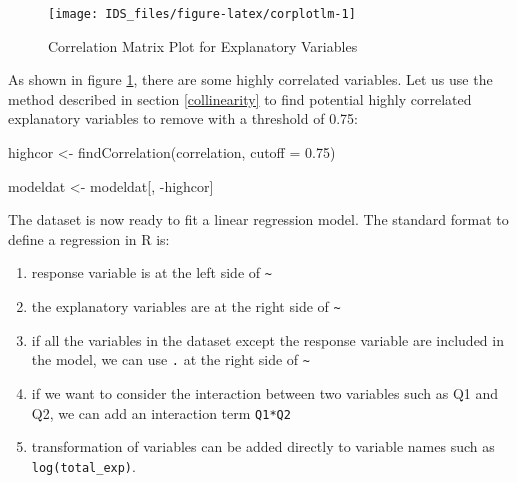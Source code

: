 \documentclass[
  12pt,
]{krantz}
\makeatletter
\newenvironment{Shaded}{\begin{snugshade}}{\end{snugshade}}
\newcommand{\AttributeTok}[1]{\textcolor[rgb]{0.61,0.61,0.61}{#1}}
\newcommand{\FloatTok}[1]{\textcolor[rgb]{0.06,0.06,0.06}{#1}}
\newcommand{\FunctionTok}[1]{\textcolor[rgb]{0,0,0}{#1}}
\newcommand{\NormalTok}[1]{#1}
\newcommand{\OtherTok}[1]{\textcolor[rgb]{0.37,0.37,0.37}{#1}}
\newcommand{\SpecialCharTok}[1]{\textcolor[rgb]{0,0,0}{#1}}
\newenvironment{kframe}{%
\medskip{}
\setlength{\fboxsep}{.8em}
 \def\at@end@of@kframe{}%
 \ifinner\ifhmode%
  \def\at@end@of@kframe{\end{minipage}}%
  \begin{minipage}{\columnwidth}%
 \fi\fi%
 \def\FrameCommand##1{\hskip\@totalleftmargin \hskip-\fboxsep
 \colorbox{shadecolor}{##1}\hskip-\fboxsep
     \hskip-\linewidth \hskip-\@totalleftmargin \hskip\columnwidth}%
 \MakeFramed {\advance\hsize-\width
   \@totalleftmargin\z@ \linewidth\hsize
   \@setminipage}}%
 {\par\unskip\endMakeFramed%
 \at@end@of@kframe}
\renewenvironment{Shaded}{\begin{kframe}}{\end{kframe}}
\makeatother
\begin{document}
\begin{figure}

{\centering \texttt{[image: IDS\_files/figure-latex/corplotlm-1]} 

}

\caption{Correlation Matrix Plot for Explanatory Variables}\label{fig:corplotlm}
\end{figure}

As shown in figure \ref{fig:corplotlm}, there are some highly correlated variables. Let us use the method described in section \ref{collinearity} to find potential highly correlated explanatory variables to remove with a threshold of 0.75:

\begin{Shaded}
\begin{Highlighting}[]
\NormalTok{highcor }\OtherTok{\textless{}{-}} \FunctionTok{findCorrelation}\NormalTok{(correlation, }\AttributeTok{cutoff =} \FloatTok{0.75}\NormalTok{)}
\end{Highlighting}
\end{Shaded}

\begin{Shaded}
\begin{Highlighting}[]
\NormalTok{modeldat }\OtherTok{\textless{}{-}}\NormalTok{ modeldat[, }\SpecialCharTok{{-}}\NormalTok{highcor]}
\end{Highlighting}
\end{Shaded}

The dataset is now ready to fit a linear regression model. The standard format to define a regression in R is:

\begin{enumerate}
\def\labelenumi{(\arabic{enumi})}
\item
  response variable is at the left side of \texttt{\textasciitilde{}}
\item
  the explanatory variables are at the right side of \texttt{\textasciitilde{}}
\item
  if all the variables in the dataset except the response variable are included in the model, we can use \texttt{.} at the right side of \texttt{\textasciitilde{}}
\item
  if we want to consider the interaction between two variables such as Q1 and Q2, we can add an interaction term \texttt{Q1*Q2}
\item
  transformation of variables can be added directly to variable names such as \texttt{log(total\_exp)}.
\end{enumerate}
\end{document}

